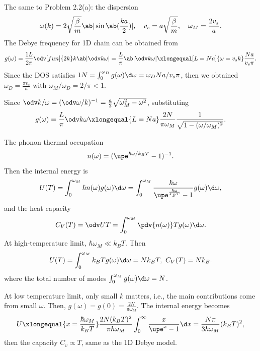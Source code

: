 \begin{solution}\leavevmode
  \begin{enumext}[label = (\alph*)]
    \item The same to Problem 2.2(a): the dispersion
    \[
      \omega(k) = 2\sqrt{\frac\beta m}\ab|\sin\ab(\frac{ka}{2})|, \quad
      v_s = a\sqrt{\frac\beta m}, \quad
      \omega_M = \frac{2v_s}{a}.
    \]
    The Debye frequency for 1D chain can be obtained from
    \[
      g(\omega) = \frac{1L}{2\pi} \odv[fun]{2k}k \ab|\odv k\omega|
    = \frac L\pi \ab|\odv k\omega|
    \xlongequal[L=Na]{\omega = v_sk} \frac{Na}{v_s\pi}.
    \]
    Since the DOS
    satisfies $1N = \int_0^{\omega_D} g(\omega) \d\omega = \omega_D Na/v_s\pi$,
    then we obtained $\omega_D = \frac{\pi v_s}{a}$
    with $\omega_M/\omega_D = 2/\pi < 1$.
    \item Since $\odv k/\omega = (\odv\omega/k)^{-1}
    = \frac a2\sqrt{\omega_M^2 - \omega^2}$, substituting
    \[
      g(\omega) = \frac L\pi \odv k\omega
    \xlongequal{L = Na} \frac{2N}{\pi\omega_M}
    \frac1{\sqrt{1 - (\omega/\omega_M)^2}}.
    \]
    \item The phonon thermal occupation
    \[
      n(\omega) = (\upe^{\hbar\omega/k_BT}-1)^{-1}.
    \]
    Then the internal energy is
    \[
      U(T) = \int_0^{\omega_M} \hbar n(\omega) g(\omega) \d\omega
    = \int_0^{\omega_M}
      \frac{\hbar\omega}{\upe^{\frac{\hbar\omega}{k_BT}} - 1}
      g(\omega) \d\omega,
    \]
    and the heat capacity
    \[
      C_V(T) = \odv UT = \int_0^{\omega_M} \pdv{n(\omega)}T g(\omega) \d\omega.
    \]
    At high-temperature limit, $\hbar\omega_M \ll k_BT$. Then
    \[
      U(T) = \int_0^{\omega_M} k_BT g(\omega) \d\omega = Nk_BT,~
      C_V(T) = Nk_B.
    \]
    where the total number of modes $\int_0^{\omega_M} g(\omega) \d\omega = N$.
    \item At low temperature limit, only small $k$ matters, i.e., the main
    contributions come from small $\omega$.
    Then, $g(\omega) = g(0) = \frac{2N}{\pi\omega_M}$.
    The internal energy becomes
    \[
      U \xlongequal{x = \frac{\hbar\omega_M}{k_BT}}
      \frac{2N(k_BT)^2}{\pi\hbar\omega_M}
      \int_0^\infty \frac{x}{\upe^x - 1} \d x
    = \frac{N\pi}{3\hbar\omega_M}(k_BT)^2,
    \]
    then the capacity $C_v \propto T$, same as the 1D Debye model.
  \end{enumext}
\end{solution}